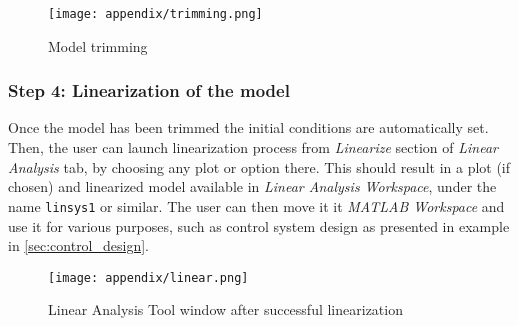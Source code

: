         \begin{figure}[H]
            \centering
            \texttt{[image: appendix/trimming.png]}
            \caption{Model trimming}
            \label{fig:lin_trimming}
        \end{figure}

        

    \subsubsection*{Step 4: Linearization of the model}
        Once the model has been trimmed the initial conditions are automatically set. Then, the user can launch linearization process from \textit{Linearize} section of \textit{Linear Analysis} tab, by choosing any plot or option there. This should result in a plot (if chosen) and linearized model available in \textit{Linear Analysis Workspace}, under the name \verb|linsys1| or similar. The user can then move it it \textit{MATLAB Workspace} and use it for various purposes, such as control system design as presented in example in \autoref{sec:control_design}.

        \begin{figure}[H]
            \centering
            \texttt{[image: appendix/linear.png]}
            \caption{Linear Analysis Tool window after successful linearization}
            \label{fig:lin_linear}
        \end{figure}